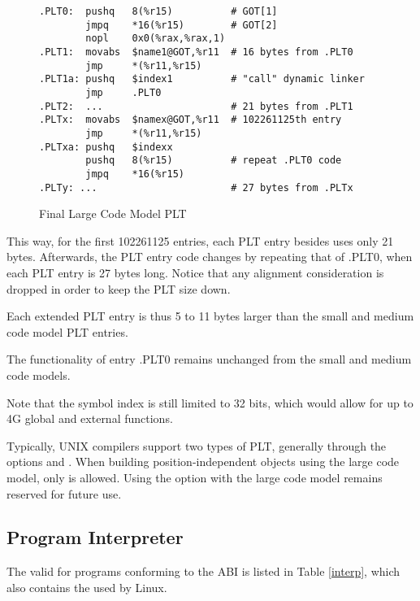 \begin{figure}[H]
\Hrule
\caption{Final Large Code Model PLT} \label{final_large_plt}
\begin{footnotesize}
\begin{verbatim}
.PLT0:  pushq   8(%r15)          # GOT[1]
        jmpq    *16(%r15)        # GOT[2]
        nopl    0x0(%rax,%rax,1)
.PLT1:  movabs  $name1@GOT,%r11  # 16 bytes from .PLT0
        jmp     *(%r11,%r15)
.PLT1a: pushq   $index1          # "call" dynamic linker
        jmp     .PLT0
.PLT2:  ...                      # 21 bytes from .PLT1
.PLTx:  movabs  $namex@GOT,%r11  # 102261125th entry
        jmp     *(%r11,%r15)
.PLTxa: pushq   $indexx
        pushq   8(%r15)          # repeat .PLT0 code
        jmpq    *16(%r15)
.PLTy: ...                       # 27 bytes from .PLTx
\end{verbatim}%
\end{footnotesize}
\end{figure} 

This way, for the first 102261125 entries, each PLT entry besides
 uses only 21 bytes. Afterwards, the PLT entry code changes
by repeating that of .PLT0, when each PLT entry is 27
bytes long.  Notice that any alignment consideration is dropped in order
to keep the PLT size down.

Each extended PLT entry is thus 5 to 11 bytes larger than the small and
medium code model PLT entries.

The functionality of entry .PLT0 remains unchanged from the small and
medium code models.

Note that the symbol index is still limited to 32 bits, which would
allow for up to 4G global and external functions.

Typically, UNIX compilers support two types of PLT, generally through
the options  and .  When building position-independent
objects using the large code model, only  is allowed. Using the
option  with the large code model remains reserved for future
use.


\subsection{Program Interpreter}

The valid  for programs conforming to the
\xARCH ABI is listed in Table \ref{interp}, which also contains the
 used by Linux.

